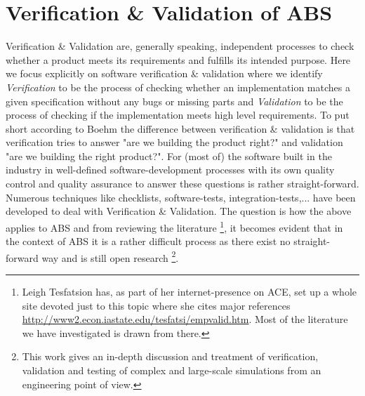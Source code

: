 \section{Verification \& Validation of ABS}
Verification \& Validation are, generally speaking, independent processes to check whether a product meets its requirements and fulfills its intended purpose. Here we focus explicitly on software verification \& validation where we identify \textit{Verification} to be the process of checking whether an implementation matches a given specification without any bugs or missing parts and \textit{Validation} to be the process of checking if the implementation meets high level requirements.
To put short according to Boehm \cite{boehm_software_1989} the difference between verification \& validation is that verification tries to answer "are we building the product right?" and validation "are we building the right product?". For (most of) the software built in the industry in well-defined software-development processes with its own quality control and quality assurance to answer these questions is rather straight-forward. Numerous techniques like checklists, software-tests, integration-tests,... have been developed to deal with Verification \& Validation. 
The question is how the above applies to ABS and from reviewing the literature \footnote{Leigh Tesfatsion has, as part of her internet-presence on ACE, set up a whole site devoted just to this topic where she cites major references \url{http://www2.econ.iastate.edu/tesfatsi/empvalid.htm}. Most of the literature we have investigated  is drawn from there.}, it becomes evident that in the context of ABS it is a rather difficult process as there exist no straight-forward way \cite{sargent_verification_2005} and is still open research \cite{balci_verification_1998} \footnote{This work gives an in-depth discussion and treatment of verification, validation and testing of complex and large-scale simulations from an engineering point of view.}.

